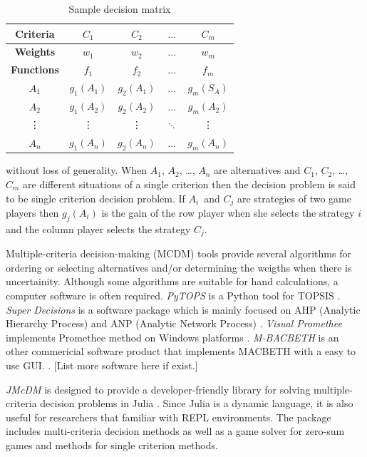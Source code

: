 \documentclass[authoryear,preprint,review,12pt]{elsarticle}
\begin{document}
\begin{table}[H]
	\centering
	\begin{tabular}{|c|c|c|c|c|}
		\hline
		\textbf{Criteria} & {$C_1$} & {$C_2$} & $\dots$ & {$C_m$} \\
		\hline
		\textbf{Weights} & {$w_1$} & {$w_2$} & $\dots$ & {$w_m$} \\
		\hline
		\textbf{Functions} & {$f_1$} & {$f_2$} & $\dots$ & {$f_m$} \\
		\hline
		\hline
		{$A_1$} & {$g_1(A_1)$} & {$g_2(A_1)$} & $\dots$ & {$g_m(S_A)$} \\
		\hline
		{$A_2$} & {$g_1(A_2)$} & {$g_2(A_2)$} & $\dots$ & {$g_m(A_2)$} \\
		\hline
		\vdots & \vdots & \vdots & $\ddots$ & \vdots  \\
		\hline		
		$A_n$ & $g_1(A_n) $ &  $g_2(A_n) $ & $\dots$ &  $g_m(A_n) $ \\
		\hline   
	\end{tabular}
	\caption{Sample decision matrix}
	\label{table:sample_decision_matrix} 
\end{table}

\noindent without loss of generality. When $A_1$, $A_2$, \dots, $A_n$ are alternatives and $C_1$, $C_2$, \dots, $C_m$ are different situations of a single criterion then the decision problem is said to be single criterion decision problem. If $A_i$ and $C_j$ are strategies of two game players then $g_j(A_i)$ is the gain of the row player when she selects the strategy $i$ and the column player selects the strategy $C_j$. 

Multiple-criteria decision-making (MCDM) tools provide several algorithms for ordering or  selecting alternatives and/or determining the weigths when there is uncertainity. Although some algorithms are suitable for hand calculations, a computer software is often required. \emph{PyTOPS} is a Python tool for TOPSIS \cite{Yadav_2019}. \emph{Super Decisions} is a software package which is mainly focused on AHP (Analytic Hierarchy Process) and ANP (Analytic Network Process) \cite{adams2003super}. \emph{Visual Promethee} implements Promethee method on Windows platforms \cite{Mareschal_2009}. \emph{M-BACBETH} is an other commericial software product that implements MACBETH with a easy to use GUI.  \cite{macbeth}. {\color{red} [List more software here if exist.]}

\emph{JMcDM} is designed to provide a developer-friendly library for solving multiple-criteria decision problems in Julia \cite{julia}. Since Julia is a dynamic language, it is also useful for researchers that familiar with REPL environments. The package includes multi-criteria decision methods as well as a game solver for zero-sum games and methods for single criterion methods. 
\end{document}
